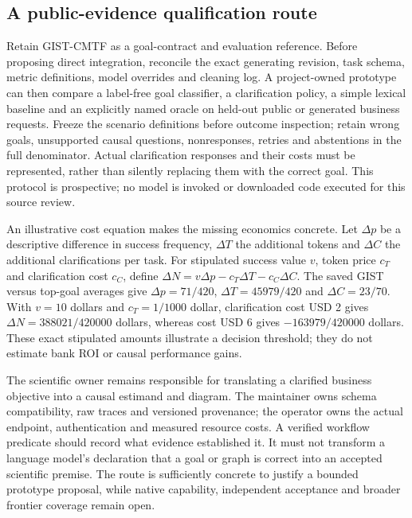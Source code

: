 \subsection{A public-evidence qualification route}
\label{exec23:gist-decision}
Retain GIST-CMTF as a goal-contract and evaluation reference. Before proposing
direct integration, reconcile the exact generating revision, task schema,
metric definitions, model overrides and cleaning log. A project-owned
prototype can then compare a label-free goal classifier, a clarification
policy, a simple lexical baseline and an explicitly named oracle on held-out
public or generated business requests. Freeze the scenario definitions before
outcome inspection; retain wrong goals, unsupported causal questions,
nonresponses, retries and abstentions in the full denominator. Actual
clarification responses and their costs must be represented, rather than
silently replacing them with the correct goal. This protocol is prospective;
no model is invoked or downloaded code executed for this source review.
\citep{exec23_gist_paper,exec23_gist_sources}

An illustrative cost equation makes the missing economics concrete. Let
$\Delta p$ be a descriptive difference in success frequency, $\Delta T$
the additional tokens and $\Delta C$ the additional clarifications per task.
For stipulated success value $v$, token price $c_T$ and clarification cost
$c_C$, define $\Delta N=v\Delta p-c_T\Delta T-c_C\Delta C$.
The saved GIST versus top-goal averages give
$\Delta p=71/420$, $\Delta T=45979/420$ and $\Delta C=23/70$.
With $v=10$ dollars and $c_T=1/1000$ dollar, clarification cost USD 2 gives
$\Delta N=388021/420000$ dollars, whereas cost USD 6 gives
$-163979/420000$ dollars. These exact stipulated amounts illustrate a decision
threshold; they do not estimate bank ROI or causal performance gains.
\citep{exec23_gist_reference}

The scientific owner remains responsible for translating a clarified business
objective into a causal estimand and diagram. The maintainer owns schema
compatibility, raw traces and versioned provenance; the operator owns the
actual endpoint, authentication and measured resource costs. A verified
workflow predicate should record what evidence established it. It must not
transform a language model's declaration that a goal or graph is correct into
an accepted scientific premise. The route is sufficiently concrete to justify
a bounded prototype proposal, while native capability, independent acceptance
and broader frontier coverage remain open.
